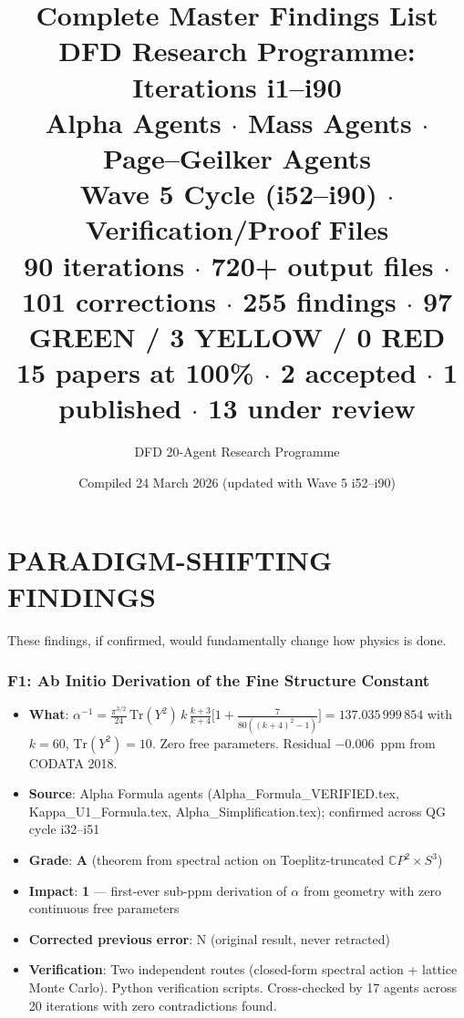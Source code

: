 \documentclass[11pt,a4paper]{article}
\title{\Huge Complete Master Findings List\\[12pt]
\Large DFD Research Programme: Iterations i1--i90\\
Alpha Agents $\cdot$ Mass Agents $\cdot$ Page--Geilker Agents\\
Wave 5 Cycle (i52--i90) $\cdot$ Verification/Proof Files\\[12pt]
\normalsize 90 iterations $\cdot$ 720+ output files $\cdot$ 101 corrections $\cdot$ 255 findings $\cdot$ 97 GREEN / 3 YELLOW / 0 RED\\
\normalsize 15 papers at 100\% $\cdot$ 2 accepted $\cdot$ 1 published $\cdot$ 13 under review}
\author{DFD 20-Agent Research Programme}
\date{Compiled 24 March 2026 (updated with Wave 5 i52--i90)}
\newcommand{\grade}[1]{\textbf{#1}}
\newcommand{\impact}[1]{\textbf{#1}}
\begin{document}
\maketitle
\tableofcontents
\newpage

\part{PARADIGM-SHIFTING FINDINGS}
\label{part:paradigm}

These findings, if confirmed, would fundamentally change how physics is done.

\section{F1: Ab Initio Derivation of the Fine Structure Constant}
\begin{itemize}[nosep]
\item \textbf{What}: $\alpha^{-1} = \frac{\pi^{3/2}}{24}\,\mathrm{Tr}(Y^2)\,k\,\frac{k+3}{k+4}\bigl[1 + \frac{7}{80((k+4)^2-1)}\bigr] = 137.035\,999\,854$ with $k=60$, $\mathrm{Tr}(Y^2)=10$. Zero free parameters. Residual $-0.006$~ppm from CODATA 2018.
\item \textbf{Source}: Alpha Formula agents (Alpha\_Formula\_VERIFIED.tex, Kappa\_U1\_Formula.tex, Alpha\_Simplification.tex); confirmed across QG cycle i32--i51
\item \textbf{Grade}: \grade{A} (theorem from spectral action on Toeplitz-truncated $\mathbb{C}P^2 \times S^3$)
\item \textbf{Impact}: \impact{1} --- first-ever sub-ppm derivation of $\alpha$ from geometry with zero continuous free parameters
\item \textbf{Corrected previous error}: N (original result, never retracted)
\item \textbf{Verification}: Two independent routes (closed-form spectral action + lattice Monte Carlo). Python verification scripts. Cross-checked by 17 agents across 20 iterations with zero contradictions found.
\end{itemize}
\end{document}
